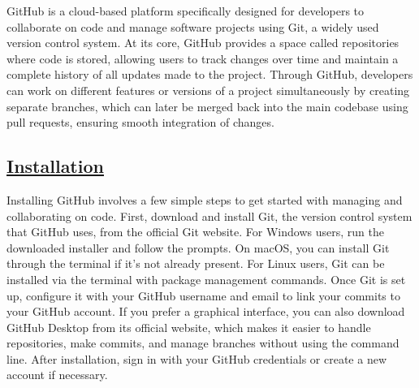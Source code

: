 \documentclass{article}
\begin{document}
\large{GitHub is a cloud-based platform specifically designed for developers to collaborate on code and manage software projects using Git, a widely used version control system. At its core, GitHub provides a space called repositories where code is stored, allowing users to track changes over time and maintain a complete history of all updates made to the project. Through GitHub, developers can work on different features or versions of a project simultaneously by creating separate branches, which can later be merged back into the main codebase using pull requests, ensuring smooth integration of changes.}
\vspace{1 cm}
\begin{center}
    \section*{\textbf{\underline{Installation}}}
\end{center}

\large{Installing GitHub involves a few simple steps to get started with managing and collaborating on code. First, download and install Git, the version control system that GitHub uses, from the official Git website. For Windows users, run the downloaded installer and follow the prompts. On macOS, you can install Git through the terminal if it’s not already present. For Linux users, Git can be installed via the terminal with package management commands. Once Git is set up, configure it with your GitHub username and email to link your commits to your GitHub account. If you prefer a graphical interface, you can also download GitHub Desktop from its official website, which makes it easier to handle repositories, make commits, and manage branches without using the command line. After installation, sign in with your GitHub credentials or create a new account if necessary.}
\end{document}
